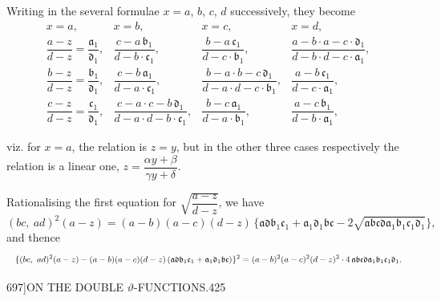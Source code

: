 \documentclass[11pt]{article}
\begin{document}
Writing in the several formulae $x = a$, $b$, $c$, $d$ successively, they become
\[ \begin{array}{cccc}
x = a, & x = b, & x = c, & x = d,\\[2pt]
\dfrac{a-z}{d-z} = \dfrac{\mathfrak{a}_{1}}{\mathfrak{d}_{1}}, & \dfrac{c-a\,\mathfrak{b}_{1}}{d-b\cdot\mathfrak{c}_{1}}, & \dfrac{b-a\,\mathfrak{c}_{1}}{d-c\cdot\mathfrak{b}_{1}}, & \dfrac{a-b\cdot a-c\cdot \mathfrak{d}_{1}}{d-b\cdot d-c\cdot \mathfrak{a}_{1}},\\[6pt]
\dfrac{b-z}{d-z} = \dfrac{\mathfrak{b}_{1}}{\mathfrak{d}_{1}}, & \dfrac{c-b\,\mathfrak{a}_{1}}{d-a\cdot\mathfrak{c}_{1}}, & \dfrac{b-a\cdot b-c\,\mathfrak{d}_{1}}{d-a\cdot d-c\cdot \mathfrak{b}_{1}}, & \dfrac{a-b\,\mathfrak{c}_{1}}{d-c\cdot \mathfrak{a}_{1}},\\[6pt]
\dfrac{c-z}{d-z} = \dfrac{\mathfrak{c}_{1}}{\mathfrak{d}_{1}}, & \dfrac{c-a\cdot c-b\,\mathfrak{d}_{1}}{d-a\cdot d-b\cdot \mathfrak{c}_{1}}, & \dfrac{b-c\,\mathfrak{a}_{1}}{d-a\cdot \mathfrak{b}_{1}}, & \dfrac{a-c\,\mathfrak{b}_{1}}{d-b\cdot \mathfrak{a}_{1}},
\end{array} \]

viz. for $x = a$, the relation is $z = y$, but in the other three cases respectively the relation is a linear one, $z = \dfrac{\alpha y + \beta}{\gamma y + \delta}$.

Rationalising the first equation for $\sqrt{\dfrac{a-z}{d-z}}$, we have
\[ (bc,\ ad)^{2}(a-z) = (a-b)(a-c)(d-z)\,\{\mathfrak{a}\mathfrak{d}\mathfrak{b}_{1}\mathfrak{c}_{1} + \mathfrak{a}_{1}\mathfrak{d}_{1}\mathfrak{b}\mathfrak{c} - 2\sqrt{\mathfrak{a}\mathfrak{b}\mathfrak{c}\mathfrak{d}\mathfrak{a}_{1}\mathfrak{b}_{1}\mathfrak{c}_{1}\mathfrak{d}_{1}}\}, \]
and thence
\[ \resizebox{\textwidth}{!}{$\displaystyle \{(bc,\ ad)^{2}(a-z) - (a-b)(a-c)(d-z)\,(\mathfrak{a}\mathfrak{d}\mathfrak{b}_{1}\mathfrak{c}_{1} + \mathfrak{a}_{1}\mathfrak{d}_{1}\mathfrak{b}\mathfrak{c})\}^{2} = (a-b)^{2}(a-c)^{2}(d-z)^{2}\cdot 4\,\mathfrak{a}\mathfrak{b}\mathfrak{c}\mathfrak{d}\mathfrak{a}_{1}\mathfrak{b}_{1}\mathfrak{c}_{1}\mathfrak{d}_{1}.$} \]

\clearpage
\begin{center}\small 697]\hfill ON THE DOUBLE $\vartheta$-FUNCTIONS.\hfill 425\end{center}
\end{document}
